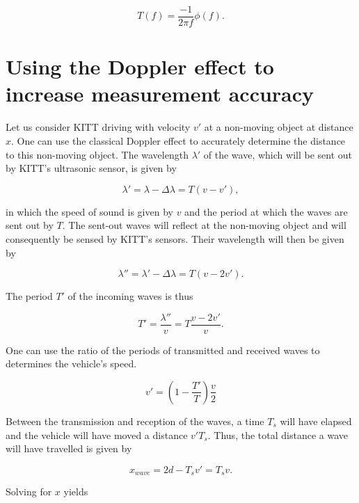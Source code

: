 \documentclass[11pt,titlepage]{report}
\begin{document}
\begin{appendices}
\begin{equation}
	T(f) = \frac{-1}{2 \pi f} \phi(f).
\end{equation}

\chapter{Using the Doppler effect to increase measurement accuracy}
\label{app:doppler}
Let us consider KITT driving with velocity $v'$ at a non-moving object at distance $x$. One can use the classical Doppler effect to accurately determine the distance to this non-moving object. The wavelength $\lambda'$ of the wave, which will be sent out by KITT's ultrasonic sensor, is given by

\begin{equation}
	\lambda' = \lambda - \Delta \lambda = T (v - v'),
\end{equation}

in which the speed of sound is given by $v$ and the period at which the waves are sent out by $T$. The sent-out waves will reflect at the non-moving object and will consequently be sensed by KITT's sensors. Their wavelength will then be given by

\begin{equation}
	\lambda'' = \lambda' - \Delta \lambda = T (v - 2 v').
\end{equation}

The period $T'$ of the incoming waves is thus

\begin{equation}
	T' = \frac{\lambda''}{v} = T \frac{v - 2 v'}{v}.
\end{equation}

One can use the ratio of the periods of transmitted and received waves to determines the vehicle's speed.

\begin{equation} \label{eq:ass-2-vel-car}
 	v' = \left(1-\frac{T'}{T} \right) \frac{v}{2}
 \end{equation}

Between the transmission and reception of the waves, a time $T_s$ will have elapsed and the vehicle will have moved a distance $v' T_s$. Thus, the total distance a wave will have travelled is given by

\begin{equation}
	x_{wave} = 2 d - T_s v' = T_s v.
\end{equation}

Solving for $x$ yields


\end{appendices}
\end{document}
